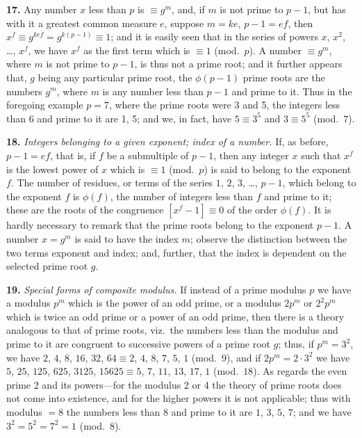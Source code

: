 \documentclass[11pt,a4paper]{article}
\begin{document}
\textbf{17.}\quad
Any number $x$ less than $p$ is $\equiv g^{m}$, and, if $m$ is not prime to $p - 1$, but has with it a greatest common measure $e$, suppose $m = ke$, $p - 1 = ef$, then $x^{f} \equiv g^{kef} = g^{k(p-1)} \equiv 1$; and it is easily seen that in the series of powers $x$, $x^{2}$, \ldots, $x^{f}$, we have $x^{f}$ as the first term which is $\equiv 1$ (mod.\ $p$). A number $\equiv g^{m}$, where $m$ is not prime to $p - 1$, is thus not a prime root; and it further appears that, $g$ being any particular prime root, the $\phi(p - 1)$ prime roots are the numbers $g^{m}$, where $m$ is any number less than $p - 1$ and prime to it. Thus in the foregoing example $p = 7$, where the prime roots were 3 and 5, the integers less than 6 and prime to it are 1, 5; and we, in fact, have $5 \equiv 3^{5}$ and $3 \equiv 5^{5}$ (mod.\ $7$).

\textbf{18.}\quad
\textit{Integers belonging to a given exponent; index of a number.} If, as before, $p - 1 = ef$, that is, if $f$ be a submultiple of $p - 1$, then any integer $x$ such that $x^{f}$ is the lowest power of $x$ which is $\equiv 1$ (mod.\ $p$) is said to belong to the exponent $f$. The number of residues, or terms of the series $1$, $2$, $3$, \ldots, $p - 1$, which belong to the exponent $f$ is $\phi(f)$, the number of integers less than $f$ and prime to it; these are the roots of the congruence $[x^{f} - 1] \equiv 0$ of the order $\phi(f)$. It is hardly necessary to remark that the prime roots belong to the exponent $p - 1$. A number $x = g^{m}$ is said to have the index $m$; observe the distinction between the two terms exponent and index; and, further, that the index is dependent on the selected prime root $g$.

\textbf{19.}\quad
\textit{Special forms of composite modulus.} If instead of a prime modulus $p$ we have a modulus $p^{m}$ which is the power of an odd prime, or a modulus $2p^{m}$ or $2^{2}p^{m}$ which is twice an odd prime or a power of an odd prime, then there is a theory analogous to that of prime roots, viz.\ the numbers less than the modulus and prime to it are congruent to successive powers of a prime root $g$; thus, if $p^{m} = 3^{2}$, we have $2$, $4$, $8$, $16$, $32$, $64 \equiv 2$, $4$, $8$, $7$, $5$, $1$ (mod.\ $9$), and if $2p^{m} = 2 \cdot 3^{2}$ we have $5$, $25$, $125$, $625$, $3125$, $15625 \equiv 5$, $7$, $11$, $13$, $17$, $1$ (mod.\ $18$). As regards the even prime 2 and its powers---for the modulus 2 or 4 the theory of prime roots does not come into existence, and for the higher powers it is not applicable; thus with modulus $= 8$ the numbers less than 8 and prime to it are $1$, $3$, $5$, $7$; and we have $3^{2} = 5^{2} = 7^{2} = 1$ (mod.\ $8$).
\end{document}
